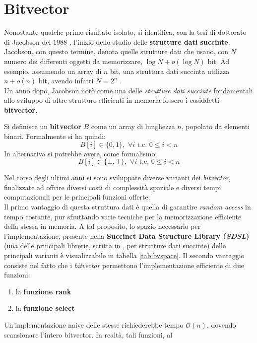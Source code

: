 \section{Bitvector}
\label{bvsec}
Nonostante qualche primo risultato isolato, si identifica, con la tesi di
dottorato di Jacobson 
del 1988 \cite{succinct}, l'inizio dello studio delle \textbf{strutture dati
  succinte}. Jacobson, con questo termine, denota quelle strutture dati che
usano, con $N$ numero dei differenti oggetti da memorizzare, $\log N+o(\log N)$
bit. Ad esempio, assumendo un array di $n$ bit, una struttura dati succinta
utilizza $n+o(n)$ bit, avendo infatti $N=2^n$ \cite{navarro}.\\
Un anno dopo, Jacobson \cite{jacobson} notò come una delle \textit{strutture
  dati succinte} fondamentali allo sviluppo di altre strutture efficienti in
memoria fossero i cosiddetti \textbf{bitvector}.
\begin{definizione}
  Si definisce un \textbf{bitvector} $B$ come un array di lunghezza $n$,
  popolato da elementi binari. Formalmente si ha quindi:
  \[B[i]\in\{0,1\},\,\,\forall i \mbox{ t.c. } 0\leq i < n\]
  In alternativa si potrebbe avere, come formalismo:
  \[B[i]\in\{\bot,\top\},\,\,\forall i \mbox{ t.c. } 0\leq i < n\]
\end{definizione}
Nel corso degli ultimi anni si sono sviluppate diverse varianti dei
\textit{bitvector}, finalizzate ad offrire diversi costi di complessità spaziale
e 
diversi tempi computazionali per le principali funzioni offerte.\\
Il primo vantaggio di questa struttura dati è quella di garantire \textit{random
  access} in tempo costante, pur 
sfruttando varie tecniche per la memorizzazione efficiente della stessa in
memoria. A tal proposito, lo spazio necessario per l'implementazione, presente
nella \textbf{Succinct Data Structure Library (\textit{SDSL})} \cite{sdsl} (una
delle principali librerie, scritta in , per strutture dati
succinte) delle principali varianti è visualizzabile in tabella 
\ref{tab:bvspace}. Il secondo vantaggio consiste nel fatto che i
\textit{bitvector} permettono l'implementazione efficiente di due funzioni: 
\begin{enumerate}
  \item la \textbf{funzione rank}
  \item la \textbf{funzione select}
\end{enumerate}
Un'implementazione naive delle stesse richiederebbe tempo $\mathcal{O}(n)$,
dovendo scansionare l'intero \textup{bitvector}. In realtà, tali funzioni, al

